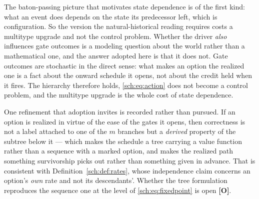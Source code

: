 The baton-passing picture that motivates state dependence is of the
first kind: what an event does depends on the state its predecessor
left, which is configuration. So the version the natural-historical
reading requires costs a multitype upgrade and not the control problem.
Whether the driver \emph{also} influences gate outcomes is a modeling
question about the world rather than a mathematical one, and the answer
adopted here is that it does not. Gate outcomes are stochastic in the
direct sense: what makes an option the realized one is a fact about the
onward schedule it opens, not about the credit held when it fires. The
hierarchy therefore holds, \eqref{sch:eq:action} does not become a
control problem, and the multitype upgrade is the whole cost of state
dependence.

One refinement that adoption invites is recorded rather than pursued. If
an option is realized in virtue of the ease of the gates it opens, then
correctness is not a label attached to one of the $m$ branches but a
\emph{derived} property of the subtree below it --- which makes the
schedule a tree carrying a value function rather than a sequence with a
marked option, and makes the realized path something survivorship picks
out rather than something given in advance. That is consistent with
Definition~\ref{sch:def:rates}, whose independence claim concerns an
option's \emph{own} rate and not its descendants'. Whether the tree
formulation reproduces the sequence one at the level of
\eqref{sch:eq:fixedpoint} is open \textbf{[O]}.

